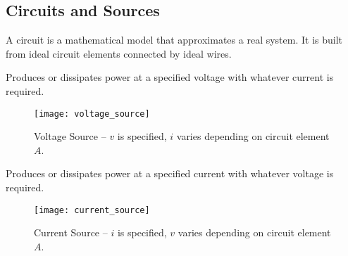 \documentclass{article}
\begin{document}
\subsection{Circuits and Sources}
\begin{definition}[Circuits]
    A circuit is a mathematical model that approximates a real system. It is built from ideal circuit elements connected by ideal wires. 
\end{definition}
\begin{definition}
    Produces or dissipates power at a specified voltage with whatever current is required. 
\end{definition}
\begin{figure}[H]
    \centering
    \texttt{[image: voltage\_source]}
    \caption{Voltage Source -- $v$ is specified, $i$ varies depending on circuit element $A$.}
\end{figure}
\begin{definition}
    Produces or dissipates power at a specified current with whatever voltage is required. 
\end{definition}
\begin{figure}[H]
    \centering
    \texttt{[image: current\_source]}
    \caption{Current Source -- $i$ is specified, $v$ varies depending on circuit element $A$.}
\end{figure}
\end{document}

